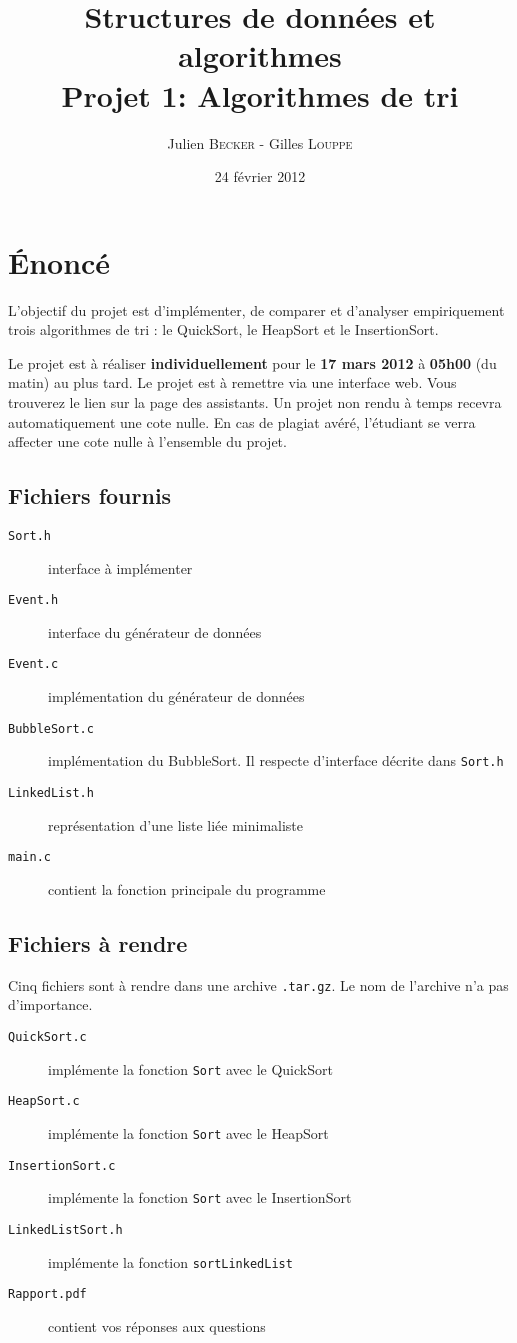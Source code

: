 \documentclass[a4paper,10pt]{article}
\title{
    \textbf{Structures de données et algorithmes}\\
    Projet 1: Algorithmes de tri
}
\author{Julien \textsc{Becker} - Gilles \textsc{Louppe}}
\date{24 février 2012}
\begin{document}
\maketitle

\section*{\'Enoncé}

L'objectif du projet est d'implémenter, de comparer et d'analyser empiriquement
trois algorithmes de tri : le QuickSort, le HeapSort et le InsertionSort.

Le projet est à réaliser {\bf individuellement} pour le {\bf 17 mars 2012} à
{\bf 05h00} (du matin) au plus tard. Le projet est à remettre via une interface
web. Vous trouverez le lien sur la page des assistants. Un projet non rendu à
temps recevra automatiquement une cote nulle. En cas de plagiat avéré,
l'étudiant se verra affecter une cote nulle à l'ensemble du projet.

\subsection*{Fichiers fournis}
\begin{description}
\item[\texttt{Sort.h}] interface à implémenter
\item[\texttt{Event.h}] interface du générateur de données
\item[\texttt{Event.c}] implémentation du générateur de données
\item[\texttt{BubbleSort.c}] implémentation du BubbleSort. Il respecte d'interface décrite dans \texttt{Sort.h}
\item[\texttt{LinkedList.h}] représentation d'une liste liée minimaliste
\item[\texttt{main.c}] contient la fonction principale du programme
\end{description}
\subsection*{Fichiers à rendre}
Cinq fichiers sont à rendre dans une archive \texttt{.tar.gz}. Le nom de l'archive n'a pas d'importance.
\begin{description}
\item[\texttt{QuickSort.c}] implémente la fonction \texttt{Sort} avec le QuickSort
\item[\texttt{HeapSort.c}] implémente la fonction \texttt{Sort} avec le HeapSort
\item[\texttt{InsertionSort.c}] implémente la fonction \texttt{Sort} avec le InsertionSort
\item[\texttt{LinkedListSort.h}] implémente la fonction \texttt{sortLinkedList}
\item[\texttt{Rapport.pdf}] contient vos réponses aux questions
\end{description}
\end{document}
